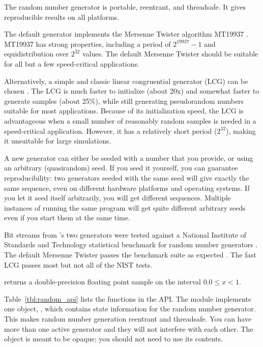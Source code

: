 The  random number generator is portable,
reentrant, and threadsafe. It gives reproducible results on all
platforms.

The default  generator implements the Mersenne
Twister algorithm MT19937 \citep{Matsumoto98}. MT19937 has strong
properties, including a period of $2^{19937}-1$ and equidistribution
over $2^{32}$ values. The default Mersenne Twister should be suitable
for all but a few speed-critical applications.

Alternatively, a simple and classic linear congruential generator
(LCG) can be chosen \citep{Knu-81a}. The LCG is much faster to
initialize (about 20x) and somewhat faster to generate samples (about
25\%), while still generating pseudorandom numbers suitable for most
applications. Because of its initialization speed, the LCG is
advantageous when a small number of reasonably random samples is
needed in a speed-critical application. However, it has a relatively
short period ($2^32$), making it unsuitable for large simulations.

A new generator can either be seeded with a number that you provide,
or using an arbitrary (quasirandom) seed. If you seed it yourself, you
can guarantee reproducibility: two generators seeded with the same
seed will give exactly the same sequence, even on different hardware
platforms and operating systems. If you let it seed itself
arbitrarily, you will get different sequences. Multiple instances of
running the same program will get quite different arbitrary seeds even
if you start them at the same time.

Bit streams from 's two generators were tested
against a National Institute of Standards and Technology statistical
benchmark for random number generators \citep{NIST08}.  The default
Mersenne Twister passes the benchmark suite as expected
\citep{Matsumoto98}. The fast LCG passes most but not all of the NIST
tests.

 returns a double-precision floating point sample
on the interval $0.0 \leq x < 1$. 

Table~\ref{tbl:random_api} lists the functions in the 
API. The module implements one object, , which
contains state information for the random number generator.  This
makes random number generation reentrant and threadsafe. You can have
more than one active generator and they will not interfere with each
other. The object is meant to be opaque; you should not need to use
its contents.  




